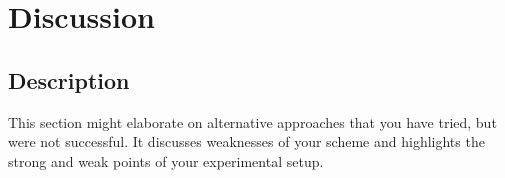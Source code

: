 \section{Discussion}
\subsection{Description}
This section might elaborate on alternative approaches that
you have tried, but were not successful. It discusses weaknesses
of your scheme and highlights the strong and weak
points of your experimental setup.
